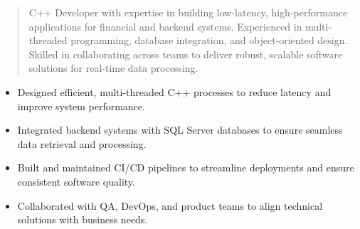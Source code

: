 



\makecvheader

\begin{quote}
  \noindent
  C++ Developer with expertise in building low-latency, high-performance applications for financial and backend systems. Experienced in multi-threaded programming, database integration, and object-oriented design. Skilled in collaborating across teams to deliver robust, scalable software solutions for real-time data processing.
\end{quote}

\par\smallskip
\noindent
\begin{minipage}{20cm}
  \begin{minipage}{9.75cm}
    \begin{itemize}
      \item Designed efficient, multi-threaded C++ processes to reduce latency and improve system performance.
      \item Integrated backend systems with SQL Server databases to ensure seamless data retrieval and processing.
    \end{itemize}
  \end{minipage}
  \hfill
  \begin{minipage}{9.75cm}
    \begin{itemize}
      \item Built and maintained CI/CD pipelines to streamline deployments and ensure consistent software quality.
      \item Collaborated with QA, DevOps, and product teams to align technical solutions with business needs.
    \end{itemize}
  \end{minipage}
\end{minipage}
\par\smallskip
\divider

